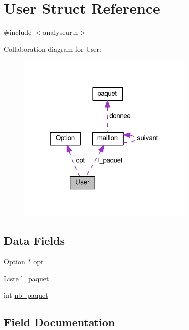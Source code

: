 \hypertarget{struct_user}{}\section{User Struct Reference}
\label{struct_user}


{\ttfamily \#include $<$analyseur.\+h$>$}



Collaboration diagram for User\+:
\nopagebreak
\begin{figure}[H]
\begin{center}
\leavevmode
\includegraphics[width=243pt]{struct_user__coll__graph}
\end{center}
\end{figure}
\subsection*{Data Fields}
\begin{DoxyCompactItemize}
\item 
\hyperlink{struct_option}{Option} $\ast$ \hyperlink{struct_user_abf0b5d238619365cb08656c04e77bd28}{opt}
\item 
\hyperlink{analyseur_8h_a59ebf944443232737291655fc0b45ff2}{Liste} \hyperlink{struct_user_ad3b02cc08546fd807de16745eb9fc0ef}{l\+\_\+paquet}
\item 
int \hyperlink{struct_user_ac5d5fb856fd497fae6e967afd55bfab2}{nb\+\_\+paquet}
\end{DoxyCompactItemize}


\subsection{Field Documentation}

